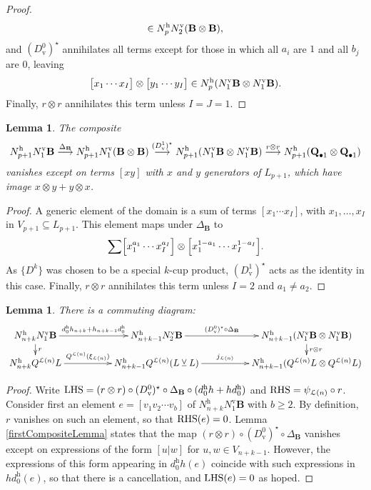 \documentclass[11pt]{amsart} \renewcommand{\baselinestretch}{1.2}
\theoremstyle{plain}
\newtheorem{lem}[thm]{Lemma}
\numberwithin{equation}{section} %
\theoremstyle{plain}
\newtheorem{lem}[thm]{Lemma}
\numberwithin{equation}{chapter} %
\renewcommand{\to}{\longrightarrow}
\newcommand{\calL}{\mathcal{L}}
\newcommand{\DeltatubfD}{\Delta_{\mathrm{\textbf{B}}}}
\newcommand{\uver}{^\mathrm{v}}
\newcommand{\uhor}{^\mathrm{h}}
\newcommand{\dver}{_\mathrm{v}}
\newcommand{\smashcoprod}{\veebar}%
\begin{document}
\begin{appendices}
\begin{proof}
\[\in N\uhor_{p}N\uver_2(\textup{\textbf{B}}\otimes\textup{\textbf{B}}),
\]
and $(D\dver^0)^\star$ annihilates all terms except for those in which all $a_i$ are $1$ and all $b_j$ are $0$, leaving
\[\bigl[x_1\cdots x_I\bigr]\otimes
\bigl[y_1\cdots y_I\bigr]\in N\uhor_{p}(N\uver_1\textup{\textbf{B}}\otimes N\uver_1\textup{\textbf{B}}).\]
Finally, $r\otimes r$ annihilates this term unless $I=J=1$.
\end{proof}
\begin{lem}
\label{secondCompositeLemma}
The composite
\[N\uhor_{p+1} N\uver_1\textup{\textbf{B}}\overset{\DeltatubfD}{\to} N\uhor_{p+1}N\uver_1(\textup{\textbf{B}}\otimes\textup{\textbf{B}}) \overset{(D\dver^1)^\star}{\to} N\uhor_{p+1}(N\uver_1\textup{\textbf{B}}\otimes N\uver_1\textup{\textbf{B}})\overset{r\otimes r}{\to}N\uhor_{p+1}(\textup{\textbf{Q}}_{\bullet 1}\otimes \textup{\textbf{Q}}_{\bullet 1})\]
vanishes except on terms $[xy]$ with $x$ and $y$ generators of $ L_{p+1}$, which have image $x\otimes y+y\otimes x$.
\end{lem}
\begin{proof}
A generic element of the domain is a sum of terms $[x_1\cdots x_I]$, with $x_1,\ldots,x_I$ in $V_{p+1}\subseteq L_{p+1}$. This element maps under $\DeltatubfD$ to
\[\sum
\Bigl[x_1^{a_1}\cdots x_I^{a_I}\Bigr]\otimes
\Bigl[x_1^{1-a_1}\cdots x_I^{1-a_I}\Bigr].\]
As $\{D^k\}$ was chosen to be a special $k$-cup product, $(D\dver^1)^\star$ acts as the identity in this case.
Finally, $r\otimes r$ annihilates this term unless $I=2$ and $a_1\neq a_2$.
\end{proof}
\begin{lem}
\label{commuting rectangle lemma for lie operations}
There is a commuting diagram:
\[\xymatrix@R=4mm@C=18mm{
N\uhor_{n+k}N\uver_1\textup{\textbf{B}} \ar[r]^-{d\uhor_0h_{n+k}+h_{n+k-1}d\uhor_0}
\ar[d]^-{r}&%
N\uhor_{n+k-1}N\uver_2\textup{\textbf{B}} \ar[r]^-{(D\dver^0)^\star\circ\DeltatubfD}&%
N\uhor_{n+k-1}(N\uver_1\textup{\textbf{B}}\otimes N\uver_1\textup{\textbf{B}})\ar[d]^-{r\otimes r}
\\%
N\uhor_{n+k}Q^{\calL(n)} L  \ar[r]^-{Q^{\calL(n)}(\xi_{\calL(n)})}&%
N\uhor_{n+k-1}Q^{\calL(n)}( L\smashcoprod  L) \ar[r]^-{j_{\calL(n)}}&%
N\uhor_{n+k-1}(Q^{\calL(n)} L \otimes Q^{\calL(n)} L )
}\]
\end{lem}
\begin{proof}
Write
$\textup{LHS}=(r\otimes r)\circ (D\dver^0)^\star\circ\DeltatubfD\circ(d\uhor_0h+hd\uhor_0)$ and $\textup{RHS}= \psi_{\calL(n)}\circ r$.
Consider first an element $e=[v_1v_2\cdots v_b]$ of $N\uhor_{n+k}N\uver_1\textbf{B}$ with $b\geq2$. By definition, $r$ vanishes on such an element, so that $\textup{RHS}(e)=0$. Lemma \ref{firstCompositeLemma} states that the map $(r\otimes r)\circ (D\dver^0)^\star\circ\DeltatubfD$ vanishes except on expressions of the form $[u|w]$ for $u,w\in V_{n+k-1}$. However, the expressions of this form appearing in $d\uhor_0h(e)$ coincide with such expressions in $hd\uhor_0(e)$, so that there is a cancellation, and $\textup{LHS}(e)=0$ as hoped. 


\end{proof}
\end{appendices}
\end{document}
